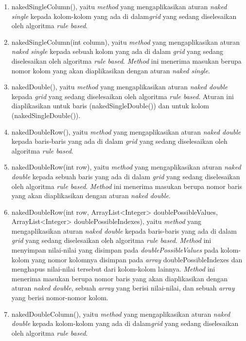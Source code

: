 \begin{enumerate}
\item nakedSingleColumn(), yaitu \textit{method} yang mengaplikasikan aturan \textit{naked single} kepada kolom-kolom yang ada di dalam\textit{grid} yang sedang diselesaikan oleh algoritma \textit{rule based}.
\item nakedSingleColumn(int column), yaitu \textit{method} yang mengaplikasikan aturan \textit{naked single} kepada sebuah kolom yang ada di dalam \textit{grid} yang sedang diselesaikan oleh algoritma \textit{rule based}. \textit{Method} ini menerima masukan berupa nomor kolom yang akan diaplikasikan dengan aturan \textit{naked single}.
\item nakedDouble(), yaitu \textit{method} yang mengaplikasikan aturan \textit{naked double} kepada \textit{grid} yang sedang diselesaikan oleh algoritma \textit{rule based}. Aturan ini diaplikasikan untuk baris (nakedSingleDouble()) dan untuk kolom (nakedSingleDouble()).
\item nakedDoubleRow(), yaitu \textit{method} yang mengaplikasikan aturan \textit{naked double} kepada baris-baris yang ada di dalam \textit{grid} yang sedang diselesaikan oleh algoritma \textit{rule based}.
\item nakedDoubleRow(int row), yaitu \textit{method} yang mengaplikasikan aturan \textit{naked double} kepada sebuah baris yang ada di dalam \textit{grid} yang sedang diselesaikan oleh algoritma \textit{rule based}. \textit{Method} ini menerima masukan berupa nomor baris yang akan diaplikasikan dengan aturan \textit{naked double}.
\item nakedDoubleRow(int row, ArrayList<Integer> doublePossibleValues, ArrayList<Integer> doublePossibleIndexes), yaitu \textit{method} yang mengaplikasikan aturan \textit{naked double} kepada baris-baris yang ada di dalam \textit{grid} yang sedang diselesaikan oleh algoritma \textit{rule based}. \textit{Method} ini menyimpan nilai-nilai yang disimpan pada \textit{doublePossibleValues} pada kolom-kolom yang nomor kolomnya disimpan pada \textit{array} doublePossibleIndexes dan menghapus nilai-nilai tersebut dari kolom-kolom lainnya. \textit{Method} ini menerima masukan berupa nomor baris yang akan diaplikasikan dengan aturan \textit{naked double}, sebuah \textit{array} yang berisi nilai-nilai, dan sebuah \textit{array} yang berisi nomor-nomor kolom.
\item nakedDoubleColumn(), yaitu \textit{method} yang mengaplikasikan aturan \textit{naked double} kepada kolom-kolom yang ada di dalam\textit{grid} yang sedang diselesaikan oleh algoritma \textit{rule based}.

\end{enumerate}

